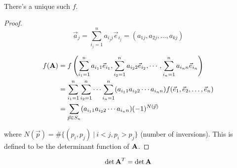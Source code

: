 \documentclass[12pt]{article}
\begin{document}
\begin{theorem}
There's a unique such $f$.
\end{theorem}

\begin{proof}
\[ \vec{a}_j = \sum_{i_j=1}^na_{i_jj}\vec{e}_{i_j} = (a_{1j},a_{2j},\dots,a_{kj}) \]

  \[
\begin{aligned}
  f({\bf A}) &= f\left(\sum_{i_1=1}^na_{i_11}\vec{e}_{i_1},\sum_{i_2=1}^na_{i_22}\vec{e}_{i_2},\cdots,\sum_{i_n=1}^na_{i_nn}\vec{e}_{i_n}\right) \\
  &= \sum_{i_1=1}^n\sum_{i_2=1}^n\cdots\sum_{i_n=1}^n(a_{i_11}a_{i_22}\cdots a_{i_nn})f(\vec{e}_1,\vec{e}_2,\dots,\vec{e}_n)\\
  &= \sum_{\vec{p} \in S_n}(a_{i_11}a_{i_22}\cdots a_{i_nn})(-1)^{N(\vec{p})}
\end{aligned}
  \]

where $N(\vec{p}) = \#\{(p_i,p_j) \ | \ i < j, p_i > p_j\}$ (number of inversions). This is defined to be the determinant function of ${\bf A}$.
\end{proof}

\begin{theorem}
\[ \det{{\bf A}^T} = \det{{\bf A}} \]
\end{theorem}
\end{document}
